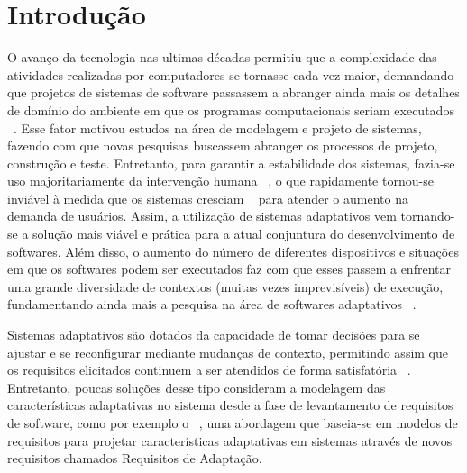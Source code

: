 

\chapter{Introdução}
\label{sec-intro}

O avanço da tecnologia nas ultimas décadas permitiu que a complexidade das atividades realizadas por computadores se tornasse cada vez maior, demandando que projetos de sistemas de software passassem a abranger ainda mais os detalhes de domínio do ambiente em que os programas computacionais seriam executados ~\cite{andersson2009modeling,brun2009engineering}. Esse fator motivou estudos na área de modelagem e projeto de sistemas, fazendo com que novas pesquisas buscassem abranger os processos de projeto, construção e teste. Entretanto, para garantir a estabilidade dos sistemas, fazia-se uso majoritariamente da intervenção humana ~\cite{andersson2009modeling}, o que rapidamente tornou-se inviável à medida que os sistemas cresciam ~\cite{andersson2009modeling} para atender o aumento na demanda de usuários. Assim, a utilização de sistemas adaptativos vem tornando-se a solução mais viável e prática para a atual conjuntura do desenvolvimento de softwares. Além disso, o aumento do número de diferentes dispositivos e situações em que os softwares podem ser executados faz com que esses passem a enfrentar uma grande diversidade de contextos (muitas vezes imprevisíveis) de execução, fundamentando ainda mais a pesquisa na área de softwares adaptativos ~\cite{kephart2003vision}.

Sistemas adaptativos são dotados da capacidade de tomar decisões para se ajustar e se reconfigurar mediante mudanças de contexto, permitindo assim que os requisitos elicitados continuem a ser atendidos de forma satisfatória ~\cite{souza2012requirement}. Entretanto, poucas soluções desse tipo consideram a modelagem das características adaptativas no sistema desde a fase de levantamento de requisitos de software, como por exemplo o \zanshin ~\cite{tesevitor}, uma abordagem que baseia-se em modelos de requisitos para projetar características adaptativas em sistemas através de novos requisitos chamados Requisitos de Adaptação. 



